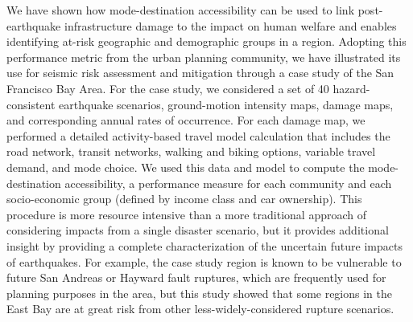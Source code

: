 We have shown how mode-destination accessibility can be used to link post-earthquake infrastructure damage to the impact on human welfare and enables identifying at-risk geographic and demographic groups in a region. 
Adopting this performance metric from the urban planning community, we have illustrated its use for seismic risk assessment and mitigation through a case study of the San Francisco Bay Area. For the case study, we considered a set of 40 hazard-consistent earthquake scenarios, ground-motion intensity maps, damage maps, and corresponding annual rates of occurrence. For each damage map, we performed a detailed activity-based travel model calculation that includes the road network, transit networks, walking and biking options, variable travel demand, and mode choice. We used this data and model to compute the mode-destination accessibility, a performance measure for each community and each socio-economic group (defined by income class and car ownership). 
This procedure is more resource intensive than a more traditional approach of considering impacts from a single disaster scenario, but it provides additional insight by providing a complete characterization of the uncertain future impacts of earthquakes. For example, the case study region is known to be vulnerable to future San Andreas or Hayward fault ruptures, which are frequently used for planning purposes in the area, but this study showed that some regions in the East Bay are at great risk from other less-widely-considered rupture scenarios. 


